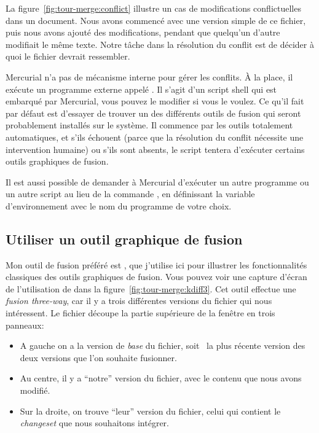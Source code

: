 La figure~\ref{fig:tour-merge:conflict} illustre un cas de modifications
conflictuelles dans un document. Nous avons commencé avec une version simple
de ce fichier, puis nous avons ajouté des modifications, pendant que 
quelqu'un d'autre modifiait le même texte. Notre tâche dans la résolution
du conflit est de décider à quoi le fichier devrait ressembler.

Mercurial n'a pas de mécanisme interne pour gérer les conflits. 
À la place, il exécute un programme externe appelé .
Il s'agit d'un script shell qui est embarqué par Mercurial, vous
pouvez le modifier si vous le voulez. Ce qu'il fait par défaut est
d'essayer de trouver un des différents outils de fusion qui seront
probablement installés sur le système. Il commence par les outils
totalement automatiques, et s'ils échouent (parce que la résolution
du conflit nécessite une intervention humaine) ou s'ils sont absents,
le script tentera d'exécuter certains outils graphiques de fusion.

Il est aussi possible de demander à Mercurial d'exécuter un autre
programme ou un autre script au lieu de la commande ,
en définissant la variable d'environnement  avec le nom
du programme de votre choix.

\subsection{Utiliser un outil graphique de fusion}

Mon outil de fusion préféré est , que j'utilise ici
pour illustrer les fonctionnalités classiques des outils graphiques 
de fusion. Vous pouvez voir une capture d'écran de l'utilisation de 
 dans la figure~\ref{fig:tour-merge:kdiff3}. Cet outil
effectue une \emph{fusion \textit{three-way}}, car il y a trois différentes
versions du fichier qui nous intéressent. Le fichier découpe la partie
supérieure de la fenêtre en trois panneaux:

\begin{itemize}
\item A gauche on a la version de \emph{base} du fichier, soit ~la plus 
  récente version des deux versions que l'on souhaite fusionner.
\item Au centre, il y a ``notre'' version du fichier, avec le contenu 
  que nous avons modifié.
\item Sur la droite, on trouve ``leur'' version du fichier, celui qui
  contient le \textit{changeset} que nous souhaitons intégrer. 
\end{itemize}

